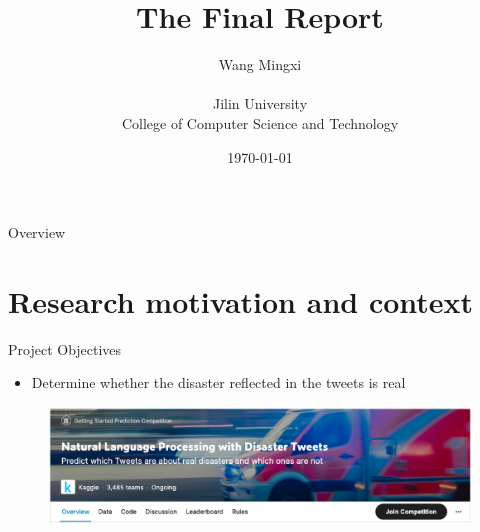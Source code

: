 \documentclass[
 size=14pt,
 paper=smartboard,  %
 mode=present, 		%
 display=slides, 	%
 style=tuliplab,  	%
 pauseslide,
 fleqn,leqno]{powerdot}
\title{The Final Report}
\author{
Wang Mingxi
\\
\\Jilin University
\\College of Computer Science and Technology
}
\date{\today} %
\begin{document}
\maketitle



\begin{slide}[toc=,bm=]{Overview}
\tableofcontents[content=currentsection,type=1]
\end{slide}


\section{Research motivation and context}

\begin{slide}{Project Objectives}

\begin{itemize}
\item Determine whether the disaster reflected in the tweets is real
\end{itemize}

\begin{center}
	\begin{figure}[htbp]
		\includegraphics[scale=0.5]{./pic/1.eps}
	\end{figure}
\end{center}

\end{slide}
\end{document}
